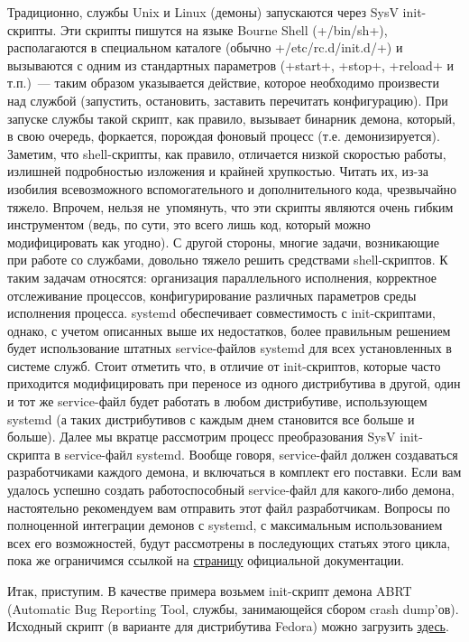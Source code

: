 \documentclass[10pt,oneside,a4paper]{article}
\begin{document}
Традиционно, службы Unix и Linux (демоны) запускаются через SysV init-скрипты.
Эти скрипты пишутся на языке Bourne Shell (+/bin/sh+), располагаются в
специальном каталоге (обычно +/etc/rc.d/init.d/+) и вызываются с одним из
стандартных параметров (+start+, +stop+, +reload+ и т.п.)~--- таким образом
указывается действие, которое необходимо произвести над службой (запустить,
остановить, заставить перечитать конфигурацию). При запуске службы такой
скрипт, как правило, вызывает бинарник демона, который, в свою очередь,
форкается, порождая фоновый процесс (т.е. демонизируется). Заметим, что
shell-скрипты, как правило, отличается низкой скоростью работы, излишней
подробностью изложения и крайней хрупкостью. Читать их, из-за изобилия
всевозможного вспомогательного и дополнительного кода, чрезвычайно тяжело.
Впрочем, нельзя не~упомянуть, что эти скрипты являются очень гибким
инструментом (ведь, по сути, это всего лишь код, который можно модифицировать
как угодно). С другой стороны, многие задачи, возникающие при работе со
службами, довольно тяжело решить средствами shell-скриптов. К таким
задачам относятся: организация параллельного исполнения, корректное
отслеживание процессов, конфигурирование различных параметров среды исполнения
процесса. systemd обеспечивает совместимость с init-скриптами, однако, с учетом
описанных выше их недостатков, более правильным решением будет использование
штатных service-файлов systemd для всех установленных в системе служб. Стоит
отметить что, в отличие от init-скриптов, которые часто приходится
модифицировать при переносе из одного дистрибутива в другой, один и тот же
service-файл будет работать в любом дистрибутиве, использующем systemd (а таких
дистрибутивов с каждым днем становится все больше и больше).  Далее мы вкратце
рассмотрим процесс преобразования SysV init-скрипта в service-файл systemd.
Вообще говоря, service-файл должен создаваться разработчиками каждого демона, и
включаться в комплект его поставки. Если вам удалось успешно создать
работоспособный service-файл для какого-либо демона, настоятельно рекомендуем
вам отправить этот файл разработчикам. Вопросы по полноценной интеграции
демонов с systemd, с максимальным использованием всех его возможностей, будут
рассмотрены в последующих статьях этого цикла, пока же ограничимся ссылкой на 
\href{http://www.freedesktop.org/software/systemd/man/daemon.html}{страницу}
официальной документации. 

Итак, приступим. В качестве примера возьмем init-скрипт демона ABRT (Automatic
Bug Reporting Tool, службы, занимающейся сбором crash dump'ов). Исходный
скрипт (в варианте для дистрибутива Fedora) можно загрузить
\href{http://0pointer.de/public/abrtd}{здесь}.
\end{document}
